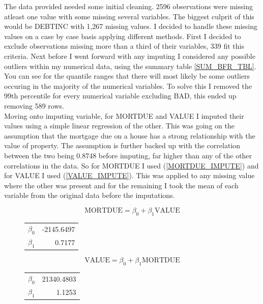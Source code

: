 The data provided needed some initial cleaning. 2596 observations were missing atleast one value with some missing several variables. The biggest culprit of this would be DEBTINC with 1,267 missing values. I decided to handle these missing values on a case by case basis applying different methods. First I decided to exclude observations missing more than a third of their variables, 339 fit this criteria. Next before I went forward with any imputing I considered any possible outliers within my numerical data, using the summary table \ref{SUM_BFR_TBL}. You can see for the quantile ranges that there will most likely be some outliers occuring in the majority of the numerical variables. To solve this I removed the 99th percentile for every numerical variable excluding BAD, this ended up removing 589 rows. \\

Moving onto imputing variable, for MORTDUE and VALUE I imputed their values using a simple linear regression of the other. This was going on the assumption that the mortgage due on a house has a strong relationship with the value of property. The assumption is further backed up with the correlation between the two being 0.8748 before imputing, far higher than any of the other correlations in the data.  So for MORTDUE I used (\ref{MORTDUE_IMPUTE}) and for VALUE I used (\ref{VALUE_IMPUTE}). This was applied to any missing value where the other was present and for the remaining I took the mean of each variable from the original data before the imputations.

\begin{equation}\label{MORTDUE_IMPUTE}
\text{MORTDUE} = \beta_{0} + \beta_{1}\text{VALUE}
\end{equation}

\begin{figure}[ht]\label{MORTDUE_IMPUTE_COEFS}
	\centering
	\begin{tabular}{lr}
	\hline
	$\beta_{0}$ & -2145.6497 \\
	$\beta_{1}$ & 0.7177 \\
	\hline
	\end{tabular}
\end{figure}

\begin{equation}\label{VALUE_IMPUTE}
\text{VALUE} = \beta_{0} + \beta_{1}\text{MORTDUE}
\end{equation}

\begin{figure}[ht]\label{VALUE_IMPUTE_COEFS}
	\centering
	\begin{tabular}{lr}
	\hline
	$\beta_{0}$ & 21340.4803 \\
	$\beta_{1}$ & 1.1253 \\
	\hline
	\end{tabular}
\end{figure}

